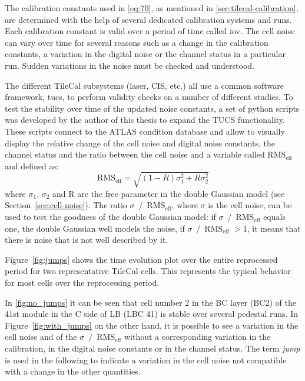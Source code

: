 The calibration constants used in \cref{eq:70}, as mentioned in
\cref{sec:tilecal-calibration}, are determined with the help of several
dedicated calibration systems and runs. Each calibration constant is valid over
a period of time called \gls{iov}. The cell noise can vary over time for several
reasons such as a change in the calibration constants, a variation in the
digital noise or the channel status in a particular run. Sudden variations in
the noise must be checked and understood.

The different TileCal subsystems (laser, CIS, etc.) all use a common software
framework, \gls{tucs}, to perform validity checks on a number of different
studies. To test the stability over time of the updated noise constants, a set
of python scripts was developed by the author of this thesis to expand the TUCS
functionality. These scripts connect to the ATLAS condition database and allow
to visually display the relative change of the cell noise and digital noise
constants, the channel status and the ratio between the cell noise and a
variable called RMS$_\text{eff}$ and defined as:
\begin{equation}
  \label{eq:73}
  \text{RMS}_{\text{eff}} = \sqrt{(1 - R) \sigma_1^2 + R \sigma_2^2}
\end{equation}
where $\sigma_1$, $\sigma_2$ and R are the free parameter in the double Gaussian
model (see Section~\ref{sec:cell-noise}).  The ratio
$\sigma$~/~RMS$_\text{eff}$, where $\sigma$ is the cell noise, can be used to
test the goodness of the double Gaussian model: if $\sigma$~/~RMS$_\text{eff}$
equals one, the double Gaussian well models the noise, if
$\sigma$~/~RMS$_\text{eff}$ $> 1$, it means that there is noise that is not well
described by it.

Figure~\ref{fig:jumps} shows the time evolution plot over the entire reprocessed
period for two representative TileCal cells. This represents the typical
behavior for most cells over the reprocessing period.

In \cref{fig:no_jumps} it can be seen that cell number 2 in the BC layer (BC2)
of the 41st module in the C side of LB (LBC 41) is stable over several pedestal
runs. In Figure~\ref{fig:with_jumps} on the other hand, it is possible to see a
variation in the cell noise and of the $\sigma$~/~RMS$_{\text{eff}}$ without a
corresponding variation in the calibration, in the digital noise constants or in
the channel status. The term \emph{jump} is used in the following to indicate a
variation in the cell noise not compatible with a change in the other
quantities.

